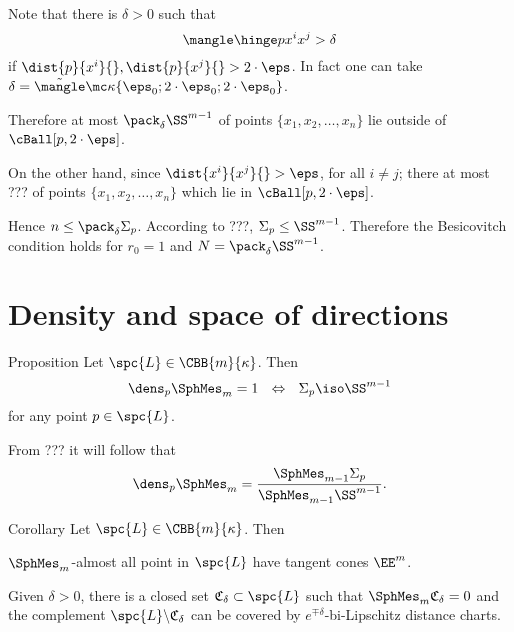 Note that there is $\delta>0$
such that 
$$\mangle \hinge p{x^i}{x^j}>\delta$$
if $\dist{p}{x^i}{},\dist{p}{x^j}{}>2\cdot\eps$.
In fact one can take  $\delta=\tilde \mangle\mc\kappa\{\eps_0;2\cdot\eps_0;2\cdot\eps_0\}$.

Therefore at most $\pack_\delta\SS^{m-1}$ of points $\{x_1,x_2,\dots,x_n\}$ lie outside of $\cBall[p,2\cdot\eps]$.

On the other hand, since $\dist{x^i}{x^j}{}>\eps$, for all $i\ne j$; there at most ??? of  points $\{x_1,x_2,\dots,x_n\}$ which lie  in $\cBall[p,2\cdot\eps]$.

Hence $n\le \pack_\delta\Sigma_p$.
According to ???, $\Sigma_p\le \SS^{m-1}$.
Therefore the Besicovitch condition holds for $r_0=1$ and $N=\pack_\delta\SS^{m-1}$.
\qeds
















\section{Density and space of directions}

\begin{thm}{Proposition}
Let $\spc{L}\in\CBB{m}{\kappa}$.
Then 
\[\dens_p\SphMes_m=1\ \ \Leftrightarrow\ \ \Sigma_p\iso\SS^{m-1}\]
for any point $p\in \spc{L}$.
\end{thm}

From ??? it will follow that 
\[\dens_p\SphMes_m=\frac{\SphMes_{m-1}\Sigma_p}{\SphMes_{m-1}\SS^{m-1}}.\]

\begin{thm}{Corollary}
Let $\spc{L}\in\CBB{m}{\kappa}$.
Then 
\begin{subthm}{}
$\SphMes_m$-almost all point in $\spc{L}$ have tangent cones $\EE^m$. 
\end{subthm}

\begin{subthm}{}
Given $\delta>0$, there is a closed set $\mathfrak{C}_\delta\subset \spc{L}$ such that $\SphMes_m\mathfrak{C}_\delta=0$ and the complement $\spc{L}\backslash\mathfrak{C}_\delta$ can be covered by $e^{\mp \delta}$-bi-Lipschitz distance charts.
\end{subthm}

\end{thm}


